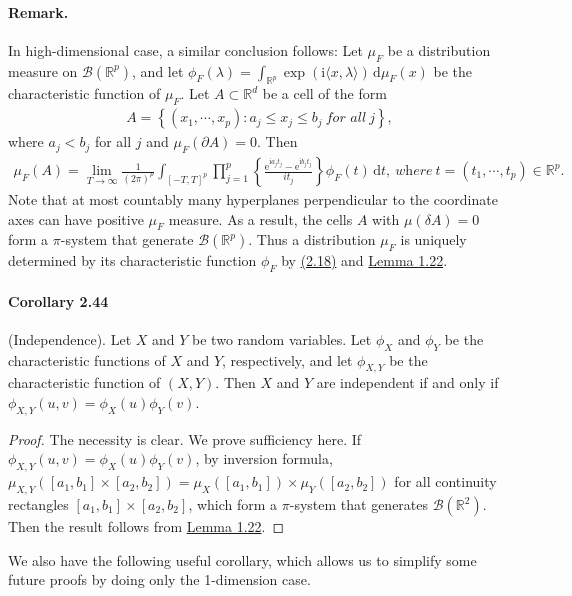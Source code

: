 \documentclass{article}
\numberwithin{equation}{section}
\newcommand{\e}{\mathrm{e}}
\renewcommand{\d}{\mathrm{d}}
\renewcommand{\i}{\mathrm{i}}
\theoremstyle{plain}
\theoremstyle{definition}
\begin{document}
\paragraph{Remark.} In high-dimensional case, a similar conclusion follows: Let $\mu_F$ be a distribution measure on $\mathscr{B}(\mathbb{R}^p)$, and let $\phi_F(\lambda)=\int_{\mathbb{R}^p}\exp\left(\i\langle x,\lambda\rangle\right)\,\d \mu_F(x)$ be the characteristic function of $\mu_F$. Let $A\subset\mathbb{R}^d$ be a cell of the form
\begin{align*}
	A=\left\{(x_1,\cdots,x_p):a_j\leq x_j\leq b_j\ \textit{for all}\ j\right\},
\end{align*}
where $a_j<b_j$ for all $j$ and $\mu_F(\partial A)=0$. Then
\begin{align*}
	\mu_F(A)=\lim_{T\to\infty}\frac{1}{(2\pi)^p}\int_{[-T,T]^p}\prod_{j=1}^p\left\{\frac{\e^{\i a_jt_j}-\e^{\i b_jt_j}}{it_j}\right\}\phi_F(t)\,\d t,\ \textit{where}\ t=(t_1,\cdots,t_p)\in\mathbb{R}^p. \tag{2.18}\label{eq:2.18}
\end{align*}
Note that at most countably many hyperplanes perpendicular to the coordinate axes can have positive $\mu_F$ measure. As a result, the cells $A$ with $\mu(\delta A)=0$ form a $\pi$-system that generate $\mathscr{B}(\mathbb{R}^p)$. Thus a distribution $\mu_F$ is uniquely determined by its characteristic function $\phi_F$ by \hyperref[eq:2.18]{(2.18)} and \hyperref[lemma:1.22]{Lemma 1.22}.

\paragraph{Corollary 2.44\label{cor:2.44}} (Independence). Let $X$ and $Y$ be two random variables. Let $\phi_X$ and $\phi_Y$ be the characteristic functions of $X$ and $Y$, respectively, and let $\phi_{X,Y}$ be the characteristic function of $(X,Y)$. Then $X$ and $Y$ are independent if and only if $\phi_{X,Y}(u,v)=\phi_X(u)\phi_Y(v)$.
\begin{proof}
The necessity is clear. We prove sufficiency here. If $\phi_{X,Y}(u,v)=\phi_X(u)\phi_Y(v)$, by inversion formula, $\mu_{X,Y}([a_1,b_1]\times[a_2,b_2])=\mu_X([a_1,b_1])\times\mu_Y([a_2,b_2])$ for all continuity rectangles $[a_1,b_1]\times[a_2,b_2]$, which form a $\pi$-system that generates $\mathscr{B}(\mathbb{R}^2)$. Then the result follows from \hyperref[lemma:1.22]{Lemma 1.22}.
\end{proof}

We also have the following useful corollary, which allows us to simplify some future proofs by doing only the 1-dimension case.
\end{document}
